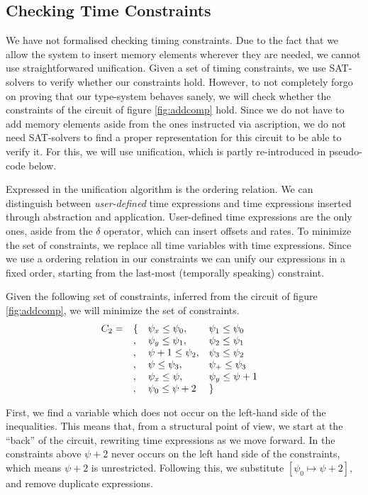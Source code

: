 \subsection{Checking Time Constraints}
We have not formalised checking timing constraints.
Due to the fact that we allow the system to insert memory elements wherever they are needed, we cannot use straightforwared unification.
Given a set of timing constraints, we use SAT-solvers to verify whether our constraints hold.
However, to not completely forgo on proving that our type-system behaves sanely, we will check whether the constraints of the circuit of figure \ref{fig:addcomp} hold.
Since we do not have to add memory elements aside from the ones instructed via ascription, we do not need SAT-solvers to find a proper representation for this circuit to be able to verify it.
For this, we will use unification, which is partly re-introduced in pseudo-code below.



Expressed in the unification algorithm is the ordering relation.
We can distinguish between \textit{user-defined} time expressions and time expressions inserted through abstraction and application.
User-defined time expressions are the only ones, aside from the $\delta$ operator, which can insert offsets and rates.
To minimize the set of constraints, we replace all time variables with time expressions.
Since we use a ordering relation in our constraints we can unify our expressions in a fixed order, starting from the last-most (temporally speaking) constraint.

Given the following set of constraints, inferred from the circuit of figure \ref{fig:addcomp}, we will minimize the set of constraints.
\[
\begin{array}{l l l l l}
C_2 = & \{ & \psi_x \le \psi_0, & \psi_1 \le \psi_0 \\
      &,   & \psi_y \le \psi_1, & \psi_2 \le \psi_1 \\
      &,   & \psi + 1 \le \psi_2, & \psi_3 \le \psi_2\\
      &,   & \psi \le \psi_3, & \psi_+ \le \psi_3 & \\ 
      &,   & \psi_x \le \psi, & \psi_y \le \psi + 1 \\
      &,   & \psi_0 \le \psi+2 & \}
\end{array}
\]

First, we find a variable which does not occur on the left-hand side of the inequalities.
This means that, from a structural point of view, we start at the ``back'' of the circuit, rewriting time expressions as we move forward.
In the constraints above $\psi+2$ never occurs on the left hand side of the constraints, which means $\psi+2$ is unrestricted.
Following this, we substitute $[\psi_0 \mapsto \psi + 2]$, and remove duplicate expressions.

